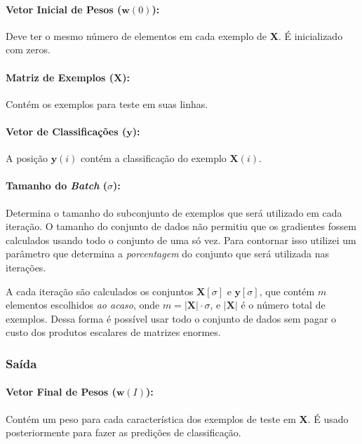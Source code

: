 \documentclass[a4paper, 12pt]{article}
\begin{document}
\paragraph{Vetor Inicial de Pesos ($\textbf{w}(0)$):}

Deve ter o mesmo número de elementos em cada exemplo de \textbf{X}.
É inicializado com zeros.

\paragraph{Matriz de Exemplos ($\textbf{X}$):}

Contém os exemplos para teste em suas linhas.

\paragraph{Vetor de Classificações ($\textbf{y}$):}

A posição $\textbf{y}(i)$ contém a classificação
do exemplo $\textbf{X}(i)$.

\paragraph{Tamanho do \textit{Batch} ($\sigma$):}

Determina o tamanho do subconjunto de exemplos que será utilizado em cada
iteração. O tamanho do conjunto de dados não permitiu que os gradientes
fossem calculados usando todo o conjunto de uma só vez. Para contornar
isso utilizei um parâmetro que determina a \textit{porcentagem} do
conjunto que será utilizada nas iterações.

A cada iteração são calculados os conjuntos $\textbf{X}[\sigma]$ e
$\textbf{y}[\sigma]$, que contém $m$  elementos escolhidos \textit{ao acaso},
onde $m = |\textbf{X}| \cdot \sigma$, e $|\textbf{X}|$ é o número total de
exemplos.  Dessa forma é possível usar todo o conjunto de dados sem pagar o
custo dos produtos escalares de matrizes enormes.

\subsubsection{Saída}

\paragraph{Vetor Final de Pesos ($\textbf{w}(I)$):}

Contém um peso para cada característica dos exemplos de teste
em \textbf{X}. É usado posteriormente para fazer as predições
de classificação.
\end{document}

